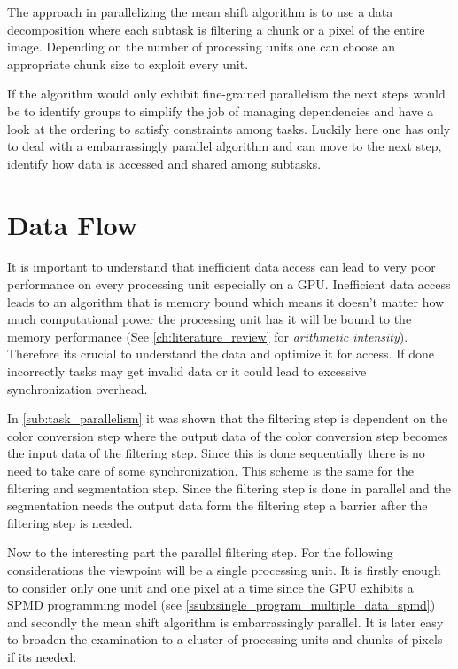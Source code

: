 The approach in parallelizing the mean shift algorithm is to use a
data decomposition where each subtask is filtering a chunk or a pixel
of the entire image. Depending on the number of processing units one
can choose an appropriate chunk size to exploit every unit.

If the algorithm would only exhibit fine-grained parallelism the next
steps would be to identify groups to simplify the job of managing
dependencies and have a look at the ordering to satisfy constraints
among tasks. Luckily here one has only to deal with a embarrassingly
parallel algorithm and can move to the next step, identify how data is
accessed and shared among subtasks.

\section{Data Flow} %
\label{sec:data_flow}

It is important to understand that inefficient data access can lead to
very poor performance on every processing unit especially on a
\gls{GPU}. Inefficient data access leads to an algorithm that is
memory bound which means it doesn't matter how much computational
power the processing unit has it will be bound to the memory
performance (See \autoref{ch:literature_review} for \emph{arithmetic
  intensity}). Therefore its crucial to understand the data and
optimize it for access. If done incorrectly tasks may get invalid data
or it could lead to excessive synchronization overhead.

In \autoref{sub:task_parallelism} it was shown that the filtering step
is dependent on the color conversion step where the output data of the
color conversion step becomes the input data of the filtering
step. Since this is done sequentially there is no need to take care of
some synchronization. This scheme is the same for the filtering and
segmentation step. Since the filtering step is done in parallel and
the segmentation needs the output data form the filtering step a
barrier after the filtering step is needed.

Now to the interesting part the parallel filtering step. For the
following considerations the viewpoint will be a single processing
unit. It is firstly enough to consider only one unit and one pixel at
a time since the \gls{GPU} exhibits a \gls{SPMD} programming model
(see \autoref{ssub:single_program_multiple_data_spmd}) and secondly
the mean shift algorithm is embarrassingly parallel. It is later easy
to broaden the examination to a cluster of processing units and chunks
of pixels if its needed.

